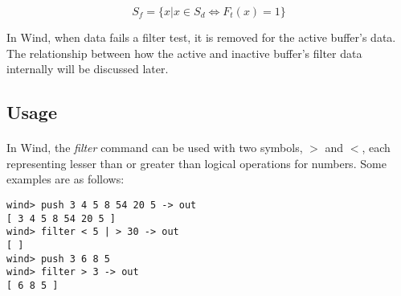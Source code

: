 $$
S_f = \{ x | x  \in S_d \iff F_t(x) = 1 \}
$$

In Wind, when data fails a filter test, it is removed for the active buffer's data. The relationship between how the active and inactive buffer's filter data internally will be discussed later.

\subsection{Usage}

\paragraph{  } In Wind, the \emph{filter} command can be used with two symbols, $>$ and $<$, each representing lesser than or greater than logical operations for numbers. Some examples are as follows:

\begin{verbatim}
wind> push 3 4 5 8 54 20 5 -> out
[ 3 4 5 8 54 20 5 ]
wind> filter < 5 | > 30 -> out
[ ]
wind> push 3 6 8 5
wind> filter > 3 -> out
[ 6 8 5 ]
\end{verbatim}


